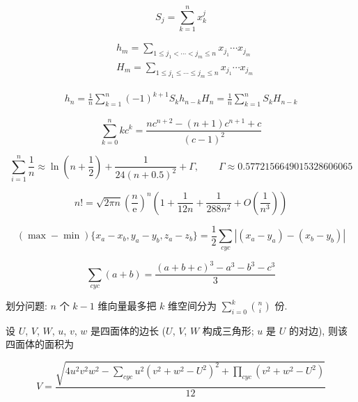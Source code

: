 \begin{equation}
    S_j = \sum_{k=1}^nx_k^j
\end{equation}

\begin{eqnarray}
    &h_m = \sum_{1\leq j_1 < \cdots < j_m \leq n} x_{j_1}\cdots x_{j_m}\\
    &H_m = \sum_{1\leq j_1 \leq \cdots \leq j_m \leq n} x_{j_1}\cdots x_{j_m}
\end{eqnarray}

\begin{eqnarray}
    h_n = \frac{1}{n}\sum_{k=1}^n(-1)^{k+1}S_kh_{n-k}
    H_n = \frac{1}{n}\sum_{k=1}^nS_kH_{n-k}
\end{eqnarray}

\begin{equation}
    \sum_{k=0}^nkc^k = \frac{nc^{n+2}-(n+1)c^{n+1}+c}{(c-1)^2}
\end{equation}

\begin{equation}
    \sum_{i=1}^n\frac{1}{n}\approx\ln\left(n + \frac 1 2\right) + \frac{1}{24(n+0.5)^2}+\Gamma,\qquad \Gamma\approx0.5772156649015328606065
\end{equation}

\begin{equation}
    n! = \sqrt{2\pi n}\left(\frac{n}{\mathrm{e}}\right)^n\left(1+\frac{1}{12n}+\frac{1}{288n^2}+O\left(\frac{1}{n^3}\right)\right)
\end{equation}

\begin{equation}
    (\max-\min){\{x_a-x_b, y_a-y_b, z_a-z_b\}} = \frac{1}{2}\sum_{cyc}\left| (x_a-y_a)-(x_b-y_b) \right|
\end{equation}

\begin{equation}
    \sum_{cyc}(a+b) = \frac{(a+b+c)^3 - a^3 - b^3 - c^3}{3}
\end{equation}

划分问题: \(n\) 个 \(k-1\) 维向量最多把 \(k\) 维空间分为 \(\sum_{i=0}^{k}\binom{n}{i}\) 份.

设 \(U\), \(V\), \(W\), \(u\), \(v\), \(w\) 是四面体的边长 (\(U\), \(V\), \(W\) 构成三角形; \(u\) 是 \(U\) 的对边), 则该四面体的面积为

\begin{equation}
    V = \frac{\sqrt{ 4u^2v^2w^2 - \sum_{cyc}{u^2(v^2+w^2-U^2)^2} + \prod_{cyc}{(v^2+w^2-U^2)} }}{12}
\end{equation}
